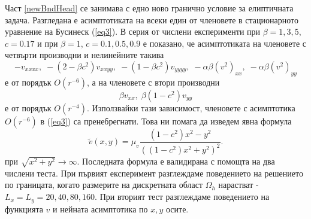 \documentclass[a4paper]{article}
\newcommand{\be}{\begin{equation}}
\newcommand{\ee}{\end{equation}}
\newcommand{\rf}[1]{(\ref{#1})}
\theoremstyle{remark}
\begin{document}
\begin{large}
Част \ref{newBndHead} се занимава с едно ново гранично условие за елиптичната задача. Разгледана е асимптотиката на всеки един от членовете в стационарното уравнение на Бусинеск \rf{eq3}. В серия от числени експерименти при $\beta=1,3,5$, $c=0.17$ и при $\beta=1$, $c=0.1, 0.5, 0.9$ е показано, че асимптотиката на членовете с четвърти производни и нелинейните такива 
$$- v_{xxxx}, \;  - (2-\beta c^2)v_{xxyy},  \;  - (1-\beta c^2)v_{yyyy}, \;  - \alpha \beta (v^2)_{xx}, \; - \alpha \beta (v^2)_{yy}$$
е от порядък $O(r^{-6})$, а на членовете с втори производни 
$$\beta v_{xx}, \; \beta (1-c^2) v_{yy}$$
 е от порядък $O(r^{-4})$. Използвайки тази зависимост, членовете с асимптотика $O(r^{-6})$ в \rf{eq3} са пренебрегнати. Това ни помага да изведем явна формула
\be
\tilde v(x, y) = \mu_v \frac{ (1-c^2) x^2 - y^2 }{ ((1-c^2) x^2 + y^2)^2 }.
\ee
при $\sqrt{x^2+y^2} \rightarrow \infty$.
Последната формула е валидирана с помощта на два числени теста. При първият експеримент разглеждаме поведението на решението по границата, когато размерите на дискретната област $\Omega_h$ нарастват - $L_x = L_y = 20, 40, 80, 160$. При вторият тест разглеждаме поведението на функцията $\widehat v$ и нейната асимптотика по $x,y$ осите.


\end{large}
\end{document}
